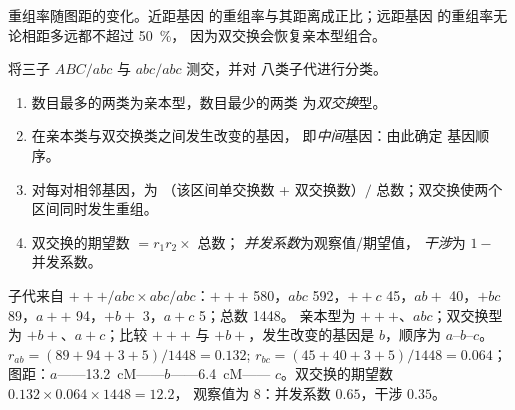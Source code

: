 \begin{omfigure}

{\small 重组率随图距的变化。近距基因
的重组率与其距离成正比；远距基因
的重组率无论相距多远都不超过 \qty{50}{\%}，
因为双交换会恢复亲本型组合。}
\end{omfigure}

\begin{method}[三点测交]\label{met:b2:meiosis-heredity:threepoint}
将三子 $ABC/abc$ 与 $abc/abc$ 测交，并对
八类子代进行分类。
\begin{enumerate}
  \item 数目最多的两类为亲本型，数目最少的两类
        为\emph{双交换}型。
  \item 在亲本类与双交换类之间发生改变的基因，
        即\emph{中间}基因：由此确定
        基因顺序。
  \item 对每对相邻基因，为
        （该区间单交换数 + 双交换数）$/$
        总数；双交换使两个区间同时发生重组。
  \item 双交换的期望数 $= r_1 r_2 \times$ 总数；
        \emph{并发系数}为观察值/期望值，
        \emph{干涉}为 $1 -$ 并发系数。
\end{enumerate}
\end{method}

\begin{example}[三点测交实例]\label{ex:b2:meiosis-heredity:threepoint}
子代来自 $+++/abc \times abc/abc$：$+++$ 580，$abc$ 592，$++c$
45，$ab+$ 40，$+bc$ 89，$a++$ 94，$+b+$ 3，$a+c$ 5；总数 1448。
亲本型为 $+++$、$abc$；双交换型为 $+b+$、$a+c$；比较 $+++$ 与
$+b+$，发生改变的基因是 $b$，顺序为 $a$--$b$--$c$。$r_{ab} =
(89 + 94 + 3 + 5)/1448 = 0.132$; $r_{bc} = (45 + 40 + 3 + 5)/1448 =
0.064$；图距：$a$——\qty{13.2}{cM}——$b$——\qty{6.4}{cM}——
$c$。双交换的期望数 $0.132\times 0.064\times 1448 = 12.2$，
观察值为 8：并发系数 $0.65$，干涉 $0.35$。
\end{example}

